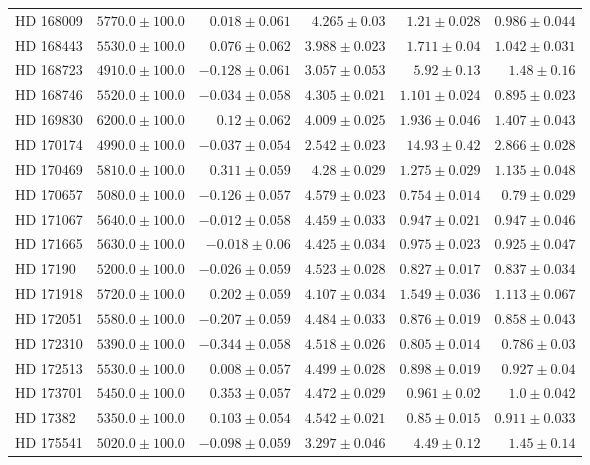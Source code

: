 \begin{longtable*}{lrrrrr}
HD 168009 & $5770.0\pm 100.0$ & $0.018\pm 0.061$ & $4.265\pm 0.03$ & $1.21\pm 0.028$ & $0.986\pm 0.044$ \\ 
HD 168443 & $5530.0\pm 100.0$ & $0.076\pm 0.062$ & $3.988\pm 0.023$ & $1.711\pm 0.04$ & $1.042\pm 0.031$ \\ 
HD 168723 & $4910.0\pm 100.0$ & $-0.128\pm 0.061$ & $3.057\pm 0.053$ & $5.92\pm 0.13$ & $1.48\pm 0.16$ \\ 
HD 168746 & $5520.0\pm 100.0$ & $-0.034\pm 0.058$ & $4.305\pm 0.021$ & $1.101\pm 0.024$ & $0.895\pm 0.023$ \\ 
HD 169830 & $6200.0\pm 100.0$ & $0.12\pm 0.062$ & $4.009\pm 0.025$ & $1.936\pm 0.046$ & $1.407\pm 0.043$ \\ 
HD 170174 & $4990.0\pm 100.0$ & $-0.037\pm 0.054$ & $2.542\pm 0.023$ & $14.93\pm 0.42$ & $2.866\pm 0.028$ \\ 
HD 170469 & $5810.0\pm 100.0$ & $0.311\pm 0.059$ & $4.28\pm 0.029$ & $1.275\pm 0.029$ & $1.135\pm 0.048$ \\ 
HD 170657 & $5080.0\pm 100.0$ & $-0.126\pm 0.057$ & $4.579\pm 0.023$ & $0.754\pm 0.014$ & $0.79\pm 0.029$ \\ 
HD 171067 & $5640.0\pm 100.0$ & $-0.012\pm 0.058$ & $4.459\pm 0.033$ & $0.947\pm 0.021$ & $0.947\pm 0.046$ \\ 
HD 171665 & $5630.0\pm 100.0$ & $-0.018\pm 0.06$ & $4.425\pm 0.034$ & $0.975\pm 0.023$ & $0.925\pm 0.047$ \\ 
HD 17190 & $5200.0\pm 100.0$ & $-0.026\pm 0.059$ & $4.523\pm 0.028$ & $0.827\pm 0.017$ & $0.837\pm 0.034$ \\ 
HD 171918 & $5720.0\pm 100.0$ & $0.202\pm 0.059$ & $4.107\pm 0.034$ & $1.549\pm 0.036$ & $1.113\pm 0.067$ \\ 
HD 172051 & $5580.0\pm 100.0$ & $-0.207\pm 0.059$ & $4.484\pm 0.033$ & $0.876\pm 0.019$ & $0.858\pm 0.043$ \\ 
HD 172310 & $5390.0\pm 100.0$ & $-0.344\pm 0.058$ & $4.518\pm 0.026$ & $0.805\pm 0.014$ & $0.786\pm 0.03$ \\ 
HD 172513 & $5530.0\pm 100.0$ & $0.008\pm 0.057$ & $4.499\pm 0.028$ & $0.898\pm 0.019$ & $0.927\pm 0.04$ \\ 
HD 173701 & $5450.0\pm 100.0$ & $0.353\pm 0.057$ & $4.472\pm 0.029$ & $0.961\pm 0.02$ & $1.0\pm 0.042$ \\ 
HD 17382 & $5350.0\pm 100.0$ & $0.103\pm 0.054$ & $4.542\pm 0.021$ & $0.85\pm 0.015$ & $0.911\pm 0.033$ \\ 
HD 175541 & $5020.0\pm 100.0$ & $-0.098\pm 0.059$ & $3.297\pm 0.046$ & $4.49\pm 0.12$ & $1.45\pm 0.14$ \\ 

\end{longtable*}
